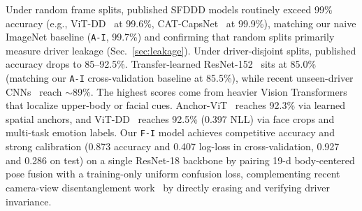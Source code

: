 Under random frame splits, published SFDDD models routinely exceed 99\%
accuracy (e.g., ViT-DD~\cite{ma2024vitdd} at 99.6\%, CAT-CapsNet~\cite{mittal2023catcaps}
at 99.9\%), matching our naive ImageNet baseline (\texttt{A-I}, 99.7\%) and
confirming that random splits primarily measure driver leakage
(Sec.~\ref{sec:leakage}). Under driver-disjoint splits, published accuracy
drops to 85--92.5\%. Transfer-learned ResNet-152~\cite{hssayeni2017} sits at
85.0\% (matching our \texttt{A-I} cross-validation baseline at 85.5\%), while recent
unseen-driver CNNs~\cite{zhangCrossDriver,essahraui2026} reach $\sim$89\%. The
highest scores come from heavier Vision Transformers that localize upper-body
or facial cues. Anchor-ViT~\cite{doshiAnchorVIT} reaches 92.3\% via learned
spatial anchors, and ViT-DD~\cite{ma2024vitdd} reaches 92.5\% (0.397 NLL) via
face crops and multi-task emotion labels. Our \texttt{F-I} model achieves
competitive accuracy and strong calibration (0.873 accuracy and 0.407 log-loss in cross-validation,
0.927 and 0.286 on test) on a single ResNet-18 backbone by pairing 19-d
body-centered pose fusion with a training-only uniform confusion loss,
complementing recent camera-view disentanglement work~\cite{celona2026dbmnet}
by directly erasing and verifying driver invariance.
